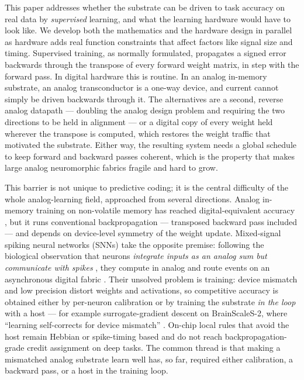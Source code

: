 \documentclass[11pt]{article}
\begin{document}
This paper addresses whether the substrate can be driven to task
accuracy on real data by \emph{supervised} learning, and what the
learning hardware would have to look like. We develop both the
mathematics and the hardware design in parallel as hardware adds real
function constraints that affect factors like signal size and timing.
Supervised training, as normally formulated, propagates a signed error
backwards through the transpose of every forward weight matrix, in step
with the forward pass. In digital hardware this is routine. In an analog
in-memory substrate, an analog transconductor is a one-way device, and
current cannot simply be driven backwards through it. The alternatives
are a second, reverse analog datapath --- doubling the analog design
problem and requiring the two directions to be held in alignment --- or
a digital copy of every weight held wherever the transpose is computed,
which restores the weight traffic that motivated the substrate. Either
way, the resulting system needs a global schedule to keep forward and
backward passes coherent, which is the property that makes large analog
neuromorphic fabrics fragile and hard to grow.

This barrier is not unique to predictive coding; it is the central
difficulty of the whole analog-learning field, approached from several
directions. Analog in-memory training on non-volatile memory has reached
digital-equivalent accuracy \cite{ambrogio2018equivalent}, but it runs
conventional backpropagation --- transposed backward pass included ---
and depends on device-level symmetry of the weight update. Mixed-signal
spiking neural networks (SNNs) take the opposite premise: following the
biological observation that neurons \emph{integrate inputs as an analog
sum but communicate with spikes} \cite{cramer2022surrogate}, they
compute in analog and route events on an asynchronous digital fabric
\cite{chicca2014neuromorphic, benjamin2014neurogrid, moradi2018dynap}.
Their unsolved problem is training: device mismatch and low precision
distort weights and activations, so competitive accuracy is obtained
either by per-neuron calibration or by training the substrate \emph{in
the loop} with a host --- for example surrogate-gradient descent on
BrainScaleS-2, where ``learning self-corrects for device mismatch''
\cite{cramer2022surrogate}. On-chip local rules that avoid the host
\cite{rubino2023neuromorphic, davies2018loihi} remain Hebbian or
spike-timing based and do not reach backpropagation-grade credit
assignment on deep tasks. The common thread is that making a mismatched
analog substrate learn well has, so far, required either calibration, a
backward pass, or a host in the training loop.
\end{document}
